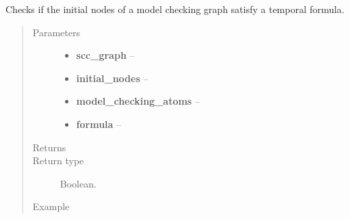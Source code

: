 \documentclass[letterpaper,10pt,english]{sphinxmanual}
\begin{document}
\begin{fulllineitems}
\label{searchingAlgorithm:searchingAlgorithm.initialNodesEntailFormula}
Checks if the initial nodes of a model checking graph satisfy a temporal formula.
\begin{quote}\begin{description}
\item[{Parameters}] \leavevmode\begin{itemize}
\item {} 
\textbf{scc\_graph} -- 

\item {} 
\textbf{initial\_nodes} -- 

\item {} 
\textbf{model\_checking\_atoms} -- 

\item {} 
\textbf{formula} -- 

\end{itemize}

\item[{Returns}] \leavevmode


\item[{Return type}] \leavevmode
Boolean.

\item[{Example }] \leavevmode
\end{description}\end{quote}

\end{fulllineitems}


\begin{fulllineitems}
\label{searchingAlgorithm:searchingAlgorithm.isSatisfied}
\end{fulllineitems}

\end{document}
